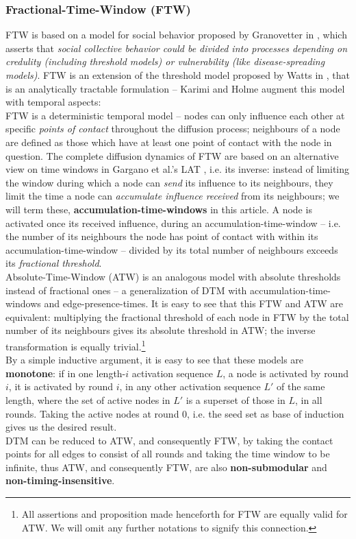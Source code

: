 \documentclass[twocolumn, 10pt]{article}
\begin{document}
\subsubsection{Fractional-Time-Window (FTW)}
FTW is based on a model for social behavior proposed by Granovetter in \cite{grano}, which asserts that \textit{social collective behavior could be divided into processes depending on credulity (including threshold models) or vulnerability (like disease-spreading models)}\cite{karimi}. FTW is an extension of the threshold model proposed by Watts in \cite{duncan}, that is an analytically tractable formulation -- Karimi and Holme augment this model with temporal aspects: \\
FTW is a deterministic temporal model -- nodes can only influence each other at specific \textit{points of contact} throughout the diffusion process; neighbours of a node are defined as those which have at least one point of contact with the node in question. The complete diffusion dynamics of FTW are based on an alternative view on time windows in Gargano et al.'s LAT \cite{gargano}, i.e. its inverse: instead of limiting the window during which a node can \textit{send} its influence to its neighbours, they limit the time a node can \textit{accumulate influence received} from its neighbours; we will term these, \textbf{accumulation-time-windows} in this article. A node is activated once its received influence, during an accumulation-time-window -- i.e. the number of its neighbours the node has point of contact with within its accumulation-time-window -- divided by its total number of neighbours exceeds its \textit{fractional threshold}. \\
Absolute-Time-Window (ATW) \cite{karimi} is an analogous model with absolute thresholds instead of fractional ones -- a generalization of DTM with accumulation-time-windows and edge-presence-times. It is easy to see that this FTW and ATW are equivalent: multiplying the fractional threshold of each node in FTW by the total number of its neighbours gives its absolute threshold in ATW; the inverse transformation is equally trivial.\footnote{All assertions and proposition made henceforth for FTW are equally valid for ATW. We will omit any further notations to signify this connection.} \\
By a simple inductive argument, it is easy to see that these models are \textbf{monotone}: if in one length-$i$ activation sequence $L$, a node is activated by round $i$, it is activated by round $i$, in any other activation sequence $L'$ of the same length, where the set of active nodes in $L'$ is a superset of those in $L$, in all rounds. Taking the active nodes at round $0$, i.e. the seed set as base of induction gives us the desired result. \\ 
DTM can be reduced to ATW, and consequently FTW, by taking the contact points for all edges to consist of all rounds and taking the time window to be infinite, thus ATW, and consequently FTW, are also \textbf{non-submodular} and \textbf{non-timing-insensitive}.
\end{document}
